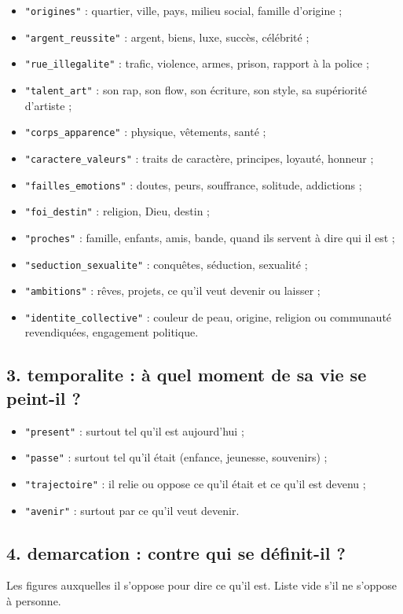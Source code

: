 \begin{itemize}
\item \texttt{"origines"} : quartier, ville, pays, milieu social, famille d'origine ;
\item \texttt{"argent\_reussite"} : argent, biens, luxe, succès, célébrité ;
\item \texttt{"rue\_illegalite"} : trafic, violence, armes, prison, rapport à la police ;
\item \texttt{"talent\_art"} : son rap, son flow, son écriture, son style, sa supériorité d'artiste ;
\item \texttt{"corps\_apparence"} : physique, vêtements, santé ;
\item \texttt{"caractere\_valeurs"} : traits de caractère, principes, loyauté, honneur ;
\item \texttt{"failles\_emotions"} : doutes, peurs, souffrance, solitude, addictions ;
\item \texttt{"foi\_destin"} : religion, Dieu, destin ;
\item \texttt{"proches"} : famille, enfants, amis, bande, quand ils servent à dire qui il est ;
\item \texttt{"seduction\_sexualite"} : conquêtes, séduction, sexualité ;
\item \texttt{"ambitions"} : rêves, projets, ce qu'il veut devenir ou laisser ;
\item \texttt{"identite\_collective"} : couleur de peau, origine, religion ou communauté revendiquées, engagement politique.
\end{itemize}

\subsection*{3. temporalite : à quel moment de sa vie se peint-il ?}
\begin{itemize}
\item \texttt{"present"} : surtout tel qu'il est aujourd'hui ;
\item \texttt{"passe"} : surtout tel qu'il était (enfance, jeunesse, souvenirs) ;
\item \texttt{"trajectoire"} : il relie ou oppose ce qu'il était et ce qu'il est devenu ;
\item \texttt{"avenir"} : surtout par ce qu'il veut devenir.
\end{itemize}

\subsection*{4. demarcation : contre qui se définit-il ?}
Les figures auxquelles il s'oppose pour dire ce qu'il est. Liste vide s'il ne s'oppose à personne.

